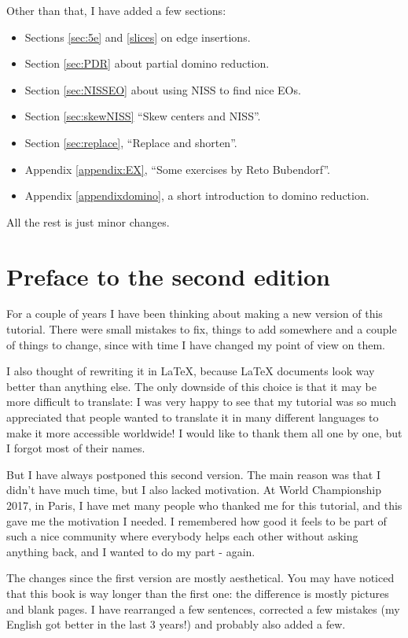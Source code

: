 \documentclass[11pt,a4paper]{book}
\begin{document}
Other than that, I have added a few sections:
\begin{itemize}
\item Sections \ref{sec:5e} and \ref{slices} on edge insertions.
\item Section \ref{sec:PDR} about partial domino reduction.
\item Section \ref{sec:NISSEO} about using NISS to find nice EOs.
\item Section \ref{sec:skewNISS} ``Skew centers and NISS''.
\item Section \ref{sec:replace}, ``Replace and shorten''.
\item Appendix \ref{appendix:EX}, ``Some exercises by Reto Bubendorf''.
\item Appendix \ref{appendixdomino}, a short introduction to domino reduction.
\end{itemize}

All the rest is just minor changes.

\newpage



\section*{Preface to the second edition}

For a couple of years I have been thinking about making a new version of this tutorial. There were small mistakes to fix, things to add somewhere and a couple of things to change, since with time I have changed my point of view on them.

I also thought of rewriting it in LaTeX, because LaTeX documents look way better than anything else. The only downside of this choice is that it may be more difficult to translate: I was very happy to see that my tutorial was so much appreciated that people wanted to translate it in many different languages to make it more accessible worldwide! I would like to thank them all one by one, but I forgot most of their names.

But I have always postponed this second version. The main reason was that I didn't have much time, but I also lacked motivation. At World Championship 2017, in Paris, I have met many people who thanked me for this tutorial, and this gave me the motivation I needed. I remembered how good it feels to be part of such a nice community where everybody helps each other without asking anything back, and I wanted to do my part - again.

\bigskip
The changes since the first version are mostly aesthetical. You may have noticed that this book is way longer than the first one: the difference is mostly pictures and blank pages. I have rearranged a few sentences, corrected a few mistakes (my English got better in the last 3 years!) and probably also added a few.
\end{document}
